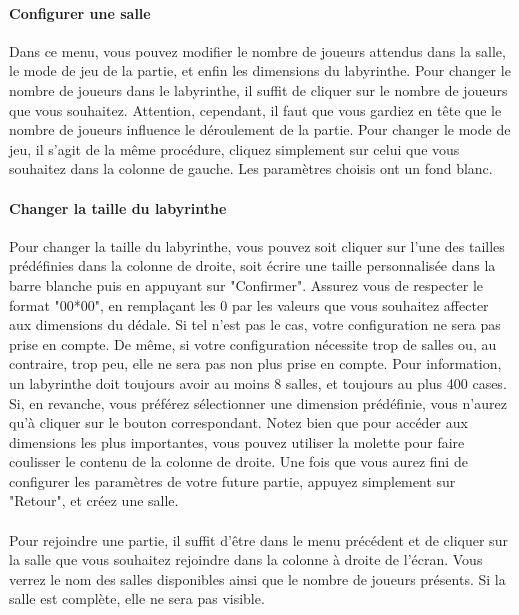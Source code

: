 \documentclass{article}
\begin{document}
\paragraph{Configurer une salle}
Dans ce menu, vous pouvez modifier le nombre de joueurs attendus dans la salle, le mode de jeu de la partie, et enfin les dimensions du labyrinthe. Pour changer le nombre de joueurs dans le labyrinthe, il suffit de cliquer sur le nombre de joueurs que vous souhaitez. Attention, cependant, il faut que vous gardiez en tête que le nombre de joueurs influence le déroulement de la partie. Pour changer le mode de jeu, il s'agit de la même procédure, cliquez simplement sur celui que vous souhaitez dans la colonne de gauche. Les paramètres choisis ont un fond blanc. 

\paragraph{Changer la taille du labyrinthe}
Pour changer la taille du labyrinthe, vous pouvez soit cliquer sur l'une des tailles prédéfinies dans la colonne de droite, soit écrire une taille personnalisée dans la barre blanche puis en appuyant sur "Confirmer". Assurez vous de respecter le format "00*00", en remplaçant les 0 par les valeurs que vous souhaitez affecter aux dimensions du dédale. Si tel n'est pas le cas, votre configuration ne sera pas prise en compte. De même, si votre configuration nécessite trop de salles ou, au contraire, trop peu, elle ne sera pas non plus prise en compte. Pour information, un labyrinthe doit toujours avoir au moins 8 salles, et toujours au plus 400 cases. Si, en revanche, vous préférez sélectionner une dimension prédéfinie, vous n'aurez qu'à cliquer sur le bouton correspondant. Notez bien que pour accéder aux dimensions les plus importantes, vous pouvez utiliser la molette pour faire coulisser le contenu de la colonne de droite. Une fois que vous aurez fini de configurer les paramètres de votre future partie, appuyez simplement sur "Retour", et créez une salle.

\paragraph{}
Pour rejoindre une partie, il suffit d'être dans le menu précédent et de cliquer sur la salle que vous souhaitez rejoindre dans la colonne à droite de l'écran. Vous verrez le nom des salles disponibles ainsi que le nombre de joueurs présents. Si la salle est complète, elle ne sera pas visible. 
\end{document}
